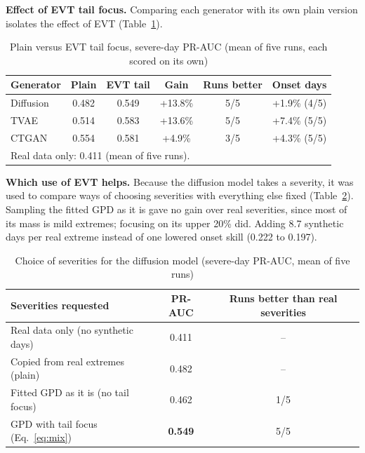 \documentclass[12pt,a4paper]{report}
\begin{document}
\textbf{Effect of EVT tail focus.} Comparing each generator with its own plain version isolates the effect
of EVT (Table~\ref{tab:evtgain}).

\begin{table}[H]
\centering
\caption{Plain versus EVT tail focus, severe-day PR-AUC (mean of five runs, each scored on its own)}
\label{tab:evtgain}
\small
\begin{tabular}{|l|c|c|c|c|c|}
\hline
\textbf{Generator} & \textbf{Plain} & \textbf{EVT tail} & \textbf{Gain} & \textbf{Runs better} & \textbf{Onset days}\\ \hline
Diffusion & 0.482 & 0.549 & +13.8\% & 5/5 & +1.9\% (4/5)\\ \hline
TVAE & 0.514 & 0.583 & +13.6\% & 5/5 & +7.4\% (5/5)\\ \hline
CTGAN & 0.554 & 0.581 & +4.9\% & 3/5 & +4.3\% (5/5)\\ \hline
\multicolumn{6}{|l|}{Real data only: 0.411 (mean of five runs).}\\ \hline
\end{tabular}
\end{table}

\textbf{Which use of EVT helps.} Because the diffusion model takes a severity, it was used to compare ways of choosing
severities with everything else fixed (Table~\ref{tab:ablation}). Sampling the fitted GPD as it is gave no gain over
real severities, since most of its mass is mild extremes; focusing on its upper 20\% did. Adding 8.7 synthetic days per
real extreme instead of one lowered onset skill (0.222 to 0.197).

\begin{table}[H]
\centering
\caption{Choice of severities for the diffusion model (severe-day PR-AUC, mean of five runs)}
\label{tab:ablation}
\small
\begin{tabular}{|l|c|c|}
\hline
\textbf{Severities requested} & \textbf{PR-AUC} & \textbf{Runs better than real severities}\\ \hline
Real data only (no synthetic days) & 0.411 & --\\ \hline
Copied from real extremes (plain) & 0.482 & --\\ \hline
Fitted GPD as it is (no tail focus) & 0.462 & 1/5\\ \hline
\rowcolor{rowhl}GPD with tail focus (Eq.~\ref{eq:mix}) & \textbf{0.549} & 5/5\\ \hline
\end{tabular}
\end{table}
\end{document}
